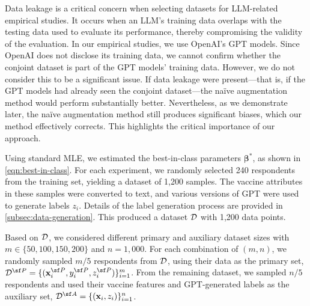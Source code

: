 Data leakage is a critical concern when selecting datasets for LLM-related empirical studies. It occurs when an LLM's training data overlaps with the testing data used to evaluate its performance, thereby compromising the validity of the evaluation. In our empirical studies, we use OpenAI's GPT models. Since OpenAI does not disclose its training data, we cannot confirm whether the conjoint dataset is part of the GPT models' training data. However, we do not consider this to be a significant issue. If data leakage were present---that is, if the GPT models had already seen the conjoint dataset---the na\"ive augmentation method would perform substantially better. Nevertheless, as we demonstrate later, the na\"ive augmentation method still produces significant biases, which our method effectively corrects. This highlights the critical importance of our approach.



Using standard MLE, we estimated the best-in-class parameters $\bm{\beta}^*$, as shown in \eqref{eqn:best-in-class}. For each experiment, we randomly selected 240 respondents from the training set, yielding a dataset of 1,200 samples. The vaccine attributes in these samples were converted to text, and various versions of GPT were used to generate labels $z_i$. Details of the label generation process are provided in \cref{subsec:data-generation}. This produced a dataset $\mathcal{D}$ with 1,200 data points.

Based on $\mathcal{D}$, we considered different primary and auxiliary dataset sizes with $m \in \{50, 100, 150, 200\}$ and $n = 1,000$. For each combination of $(m, n)$, we randomly sampled ${m}/{5}$ respondents from $\mathcal{D}$, using their data as the primary set, $\Dscr^{\sf P} = \{(\x^{\sf P}_i, y^{\sf P}_i, z^{\sf P}_i)\}_{i=1}^{m}$. From the remaining dataset, we sampled ${n}/{5}$ respondents and used their vaccine features and GPT-generated labels as the auxiliary set, $\Dscr^{\sf A} = \{(\x_i, z_i)\}_{i=1}^{n}$. 

